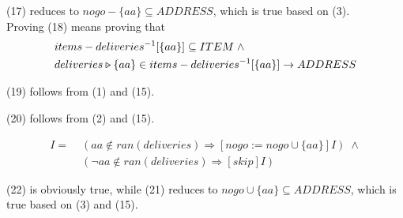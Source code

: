 \documentclass[11pt]{article}
\begin{document}
(17) reduces to $nogo - \{aa\} \subseteq ADDRESS$, which is true based on (3). \\

Proving (18) means proving that
\begin{align}
  & items - deliveries^{-1}[\{aa\}] \subseteq ITEM \; \wedge \\
	& deliveries \mathbin{\triangleright \llap{--}}
 \{aa\} \in items - deliveries^{-1}[\{aa\}] \rightarrow ADDRESS
\end{align}

(19) follows from (1) and (15).

(20) follows from (2) and (15).

\begin{align}
 [V _2]I = & \; (aa \notin ran(deliveries) \Rightarrow [nogo := nogo \cup \{aa\}] I ) \; \wedge \\
	         & \; (\neg aa \notin ran(deliveries) \Rightarrow [skip] I)
\end{align}

(22) is obviously true, while (21) reduces to $nogo \cup \{aa\} \subseteq ADDRESS$, which is true based on (3) and (15).
\end{document}
